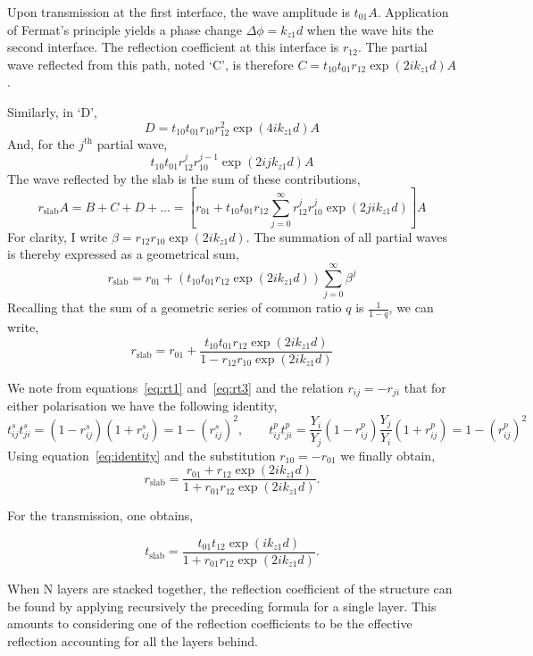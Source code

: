 \documentclass[a4paper,11pt]{article}
\begin{document}
Upon transmission at the first interface, the wave amplitude is $t_{01}A$. Application of Fermat's principle yields a phase change $\Delta \phi= k_{z1}d$ when the wave hits the second interface. The reflection coefficient at this interface is $r_{12}$. The partial wave reflected from this path, noted `C', is therefore $C=t_{10}t_{01}r_{12}\exp(2i k_{z1}d)A$.

Similarly, in `D', \[
	D=t_{10}t_{01}r_{10}r_{12}^2\exp(4i k_{z1}d)A
	\]
And, for the ${j^\text{th}}$ partial wave,
	\[
	t_{10}t_{01}r_{12}^{j}r_{10}^{{j-1}}\exp(2i {j}k_{z1}d)A
	\]
The wave reflected by the slab is the sum of these contributions,
	\[
	r_{\text{slab}}A=B+C+D+\dots=\left[r_{01}+t_{10}t_{01}r_{12}\sum_{j=0}^{\infty}r_{12}^jr_{10}^{j}\exp(2ji k_{z1} d)\right]A
	\]
For clarity, I write $\beta=r_{12}r_{10}\exp(2i k_{z1}d)$. The summation of all partial waves is thereby expressed as a geometrical sum,
	\[
	r_{\text{slab}}=r_{01} + \left(t_{10}t_{01}r_{12}\exp(2i k_{z1}d)\right)\sum_{j=0}^{\infty}\beta^j
	\]
Recalling that the sum of a geometric series of common ratio $q$ is $\frac{1}{1-q}$, we can write,
	\[
	r_{\text{slab}}=r_{01} + \frac{t_{10}t_{01}r_{12}\exp(2i k_{z1}d)}{1-r_{12}r_{10}\exp(2i k_{z1}d)}
	\]

We note from equations~\ref{eq:rt1} and~\ref{eq:rt3} and the relation $r_{ij} = -r_{ji}$ that for either polarisation we have the following identity,
\begin{equation}
	t^s_{ij}t^s_{ji}  = (1-r^s_{ij})(1+r^s_{ij})= 1-(r^s_{ij})^2 ,\qquad 
	t^p_{ij}t^p_{ji}  =\frac{Y_i}{Y_j}(1-r^p_{ij})\frac{Y_j}{Y_i}(1+r^p_{ij}) = 1-(r^p_{ij})^2
\label{eq:identity}
\end{equation}
Using equation~\ref{eq:identity} and the substitution $r_{10} = -r_{01}$ we finally obtain,
	\begin{equation}
		r_{\text{slab}}=\frac{r_{01}+r_{12}\exp(2i k_{z1}d)}{1+r_{01}r_{12}\exp(2i k_{z1}d)}.
	\label{eq:fresnelSlab}
	\end{equation}

For the transmission, one obtains,

	\begin{equation}
		t_{\text{slab}}=\frac{t_{01}t_{12}\exp(i k_{z1}d)}{1+r_{01}r_{12}\exp(2i k_{z1}d)}.
	\label{eq:fresnelTSlab}
	\end{equation}


When N layers are stacked together, the reflection coefficient of the structure can be found by applying recursively the preceding formula for a single layer. This amounts to considering one of the reflection coefficients to be the effective reflection accounting for all the layers behind.
\end{document}
